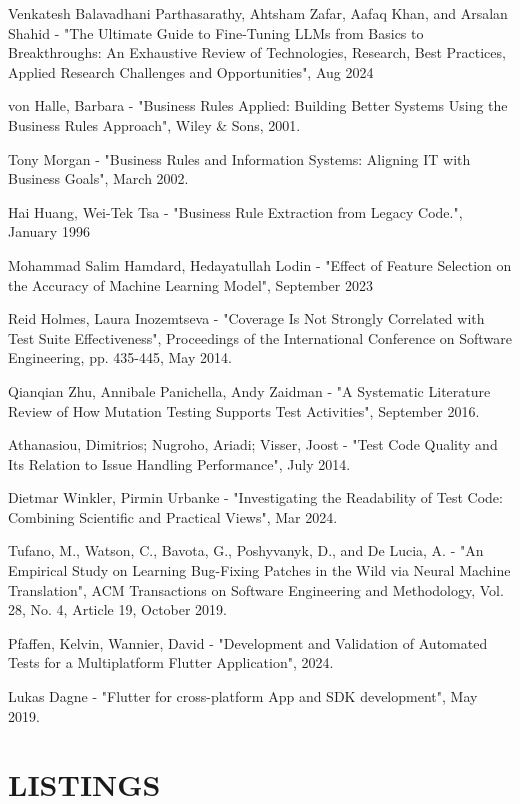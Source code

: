\documentclass[12pt, twoside]{report}
\makeatletter
\newcommand\AppendixName{Appendix}
\let\oldappendix\appendix
\renewcommand{\appendix}{%
  \oldappendix
  \renewcommand{\chaptername}{\AppendixName}  \renewcommand{\thechapter}{\@Alph\c@chapter}}
\makeatother
\begin{document}
\begin{thebibliography}{99}
Venkatesh Balavadhani Parthasarathy, Ahtsham Zafar, Aafaq Khan, and Arsalan Shahid - "The Ultimate Guide to Fine-Tuning LLMs from Basics to Breakthroughs: An Exhaustive Review of Technologies, Research, Best Practices, Applied Research Challenges and Opportunities", Aug 2024

von Halle, Barbara - "Business Rules Applied: Building Better Systems Using the Business Rules Approach", Wiley \& Sons, 2001.

Tony Morgan - "Business Rules and Information Systems: Aligning IT with Business Goals", March 2002.

Hai Huang, Wei-Tek Tsa - "Business Rule Extraction from Legacy Code.", January 1996

Mohammad Salim Hamdard, Hedayatullah Lodin - "Effect of Feature Selection on the Accuracy of Machine Learning Model", September 2023

Reid Holmes, Laura Inozemtseva - "Coverage Is Not Strongly Correlated with Test Suite Effectiveness", Proceedings of the International Conference on Software Engineering, pp. 435-445, May 2014.

Qianqian Zhu, Annibale Panichella, Andy Zaidman - "A Systematic Literature Review of How Mutation Testing Supports Test Activities", September 2016.

Athanasiou, Dimitrios; Nugroho, Ariadi; Visser, Joost - "Test Code Quality and Its Relation to Issue Handling Performance", July 2014.

Dietmar Winkler, Pirmin Urbanke - "Investigating the Readability of Test Code: Combining Scientific and Practical Views", Mar 2024.

Tufano, M., Watson, C., Bavota, G., Poshyvanyk, D., and De Lucia, A. - "An Empirical Study on Learning Bug-Fixing Patches in the Wild via Neural Machine Translation", ACM Transactions on Software Engineering and Methodology, Vol. 28, No. 4, Article 19, October 2019.

Pfaffen, Kelvin, Wannier, David - "Development and Validation of Automated Tests for a Multiplatform Flutter Application", 2024.

Lukas Dagne - "Flutter for cross-platform App and SDK development", May 2019.

\end{thebibliography}

\appendix
\chapter{LISTINGS}

\end{document}
